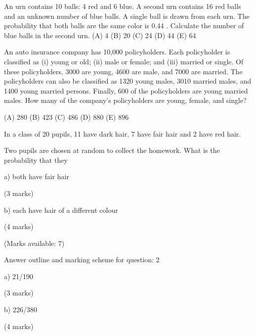 
An urn contains 10 balls: 4 red and 6 blue. A second urn contains 16 red balls and an 
unknown number of blue balls. A single ball is drawn from each urn. The probability 
that both balls are the same color is 0.44 . 
Calculate the number of blue balls in the second urn. 
 (A) 4 
 (B) 20 
 (C) 24 
 (D) 44 
 (E) 64



An auto insurance company has 10,000 policyholders. Each policyholder is classified as 
 (i) young or old; 
 (ii) male or female; and 
 (iii) married or single. 
Of these policyholders, 3000 are young, 4600 are male, and 7000 are married. The 
policyholders can also be classified as 1320 young males, 3010 married males, and 1400 
young married persons. Finally, 600 of the policyholders are young married males. 
 How many of the company’s policyholders are young, female, and single? 

(A) 280 
(B) 423 
(C) 486 
 (D) 880 
(E) 896 


In a class of 20 pupils, 11 have dark hair, 7 have fair hair and 2 have red hair.

Two pupils are chosen at random to collect the homework. What is the probability that they

a) both have fair hair

(3 marks)

b) each have hair of a different colour

(4 marks)

(Marks available: 7)

Answer outline and marking scheme for question: 2

a) 21/190

(3 marks)

b) 226/380

(4 marks)
